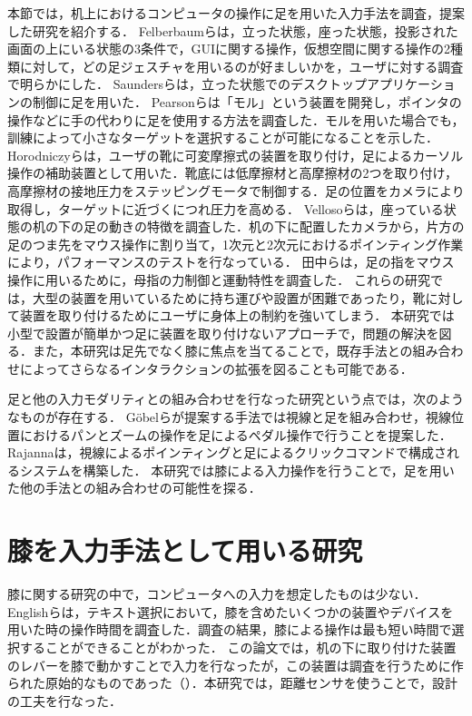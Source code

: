 本節では，机上におけるコンピュータの操作に足を用いた入力手法を調査，提案した研究を紹介する．
Felberbaumら\cite{Felberbaum:2018:BUF:3173574.3173908}は，立った状態，座った状態，投影された画面の上にいる状態の3条件で，GUIに関する操作，仮想空間に関する操作の2種類に対して，どの足ジェスチャを用いるのが好ましいかを，ユーザに対する調査で明らかにした．
Saundersら\cite{Saunders:2016:TFI:2901790.2901815}は，立った状態でのデスクトップアプリケーションの制御に足を用いた．
Pearsonら\cite{Pearson:1986:MMD:22627.22392, Pearson:1988:EET:49108.1046356}は「モル」という装置を開発し，ポインタの操作などに手の代わりに足を使用する方法を調査した．モルを用いた場合でも，訓練によって小さなターゲットを選択することが可能になることを示した．
Horodniczyら\cite{Horodniczy:2017:FHE:3025453.3025625}は，ユーザの靴に可変摩擦式の装置を取り付け，足によるカーソル操作の補助装置として用いた．靴底には低摩擦材と高摩擦材の2つを取り付け，高摩擦材の接地圧力をステッピングモータで制御する．足の位置をカメラにより取得し，ターゲットに近づくにつれ圧力を高める．
Vellosoら\cite{velloso:hal-01599657}は，座っている状態の机の下の足の動きの特徴を調査した．机の下に配置したカメラから，片方の足のつま先をマウス操作に割り当て，1次元と2次元におけるポインティング作業により，パフォーマンスのテストを行なっている．
田中ら\cite{110004704997}は，足の指をマウス操作に用いるために，母指の力制御と運動特性を調査した．
これらの研究では，大型の装置を用いているために持ち運びや設置が困難であったり，靴に対して装置を取り付けるためにユーザに身体上の制約を強いてしまう．
本研究では小型で設置が簡単かつ足に装置を取り付けないアプローチで，問題の解決を図る．また，本研究は足先でなく膝に焦点を当てることで，既存手法との組み合わせによってさらなるインタラクションの拡張を図ることも可能である．

足と他の入力モダリティとの組み合わせを行なった研究という点では，次のようなものが存在する．
G\"{o}belら\cite{Gobel:2013:GFI:2468356.2479610}が提案する手法では視線と足を組み合わせ，視線位置におけるパンとズームの操作を足によるペダル操作で行うことを提案した．
Rajanna\cite{Rajanna:2016:GFI:2876456.2876462}は，視線によるポインティングと足によるクリックコマンドで構成されるシステムを構築した．
本研究では膝による入力操作を行うことで，足を用いた他の手法との組み合わせの可能性を探る．

\section{膝を入力手法として用いる研究}
膝に関する研究の中で，コンピュータへの入力を想定したものは少ない．
Englishら\cite{1698228}は，テキスト選択において，膝を含めたいくつかの装置やデバイスを用いた時の操作時間を調査した．調査の結果，膝による操作は最も短い時間で選択することができることがわかった．
この論文では，机の下に取り付けた装置のレバーを膝で動かすことで入力を行なったが，この装置は調査を行うために作られた原始的なものであった（）．本研究では，距離センサを使うことで，設計の工夫を行なった．

